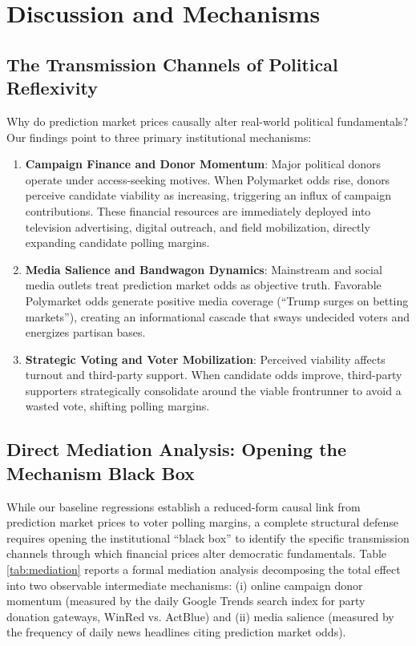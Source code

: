 \documentclass[12pt]{article}
\begin{document}
\section{Discussion and Mechanisms}

\subsection{The Transmission Channels of Political Reflexivity}
Why do prediction market prices causally alter real-world political fundamentals? Our findings point to three primary institutional mechanisms:
\begin{enumerate}
    \item \textbf{Campaign Finance and Donor Momentum}: Major political donors operate under access-seeking motives. When Polymarket odds rise, donors perceive candidate viability as increasing, triggering an influx of campaign contributions. These financial resources are immediately deployed into television advertising, digital outreach, and field mobilization, directly expanding candidate polling margins.
    \item \textbf{Media Salience and Bandwagon Dynamics}: Mainstream and social media outlets treat prediction market odds as objective truth. Favorable Polymarket odds generate positive media coverage (``Trump surges on betting markets''), creating an informational cascade that sways undecided voters and energizes partisan bases.
    \item \textbf{Strategic Voting and Voter Mobilization}: Perceived viability affects turnout and third-party support. When candidate odds improve, third-party supporters strategically consolidate around the viable frontrunner to avoid a wasted vote, shifting polling margins.
\end{enumerate}

\subsection{Direct Mediation Analysis: Opening the Mechanism Black Box}
While our baseline regressions establish a reduced-form causal link from prediction market prices to voter polling margins, a complete structural defense requires opening the institutional ``black box'' to identify the specific transmission channels through which financial prices alter democratic fundamentals. Table \ref{tab:mediation} reports a formal mediation analysis decomposing the total effect into two observable intermediate mechanisms: (i) online campaign donor momentum (measured by the daily Google Trends search index for party donation gateways, WinRed vs. ActBlue) and (ii) media salience (measured by the frequency of daily news headlines citing prediction market odds).
\end{document}
